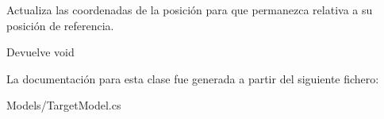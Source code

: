 Actualiza las coordenadas de la posición para que permanezca relativa a su posición de referencia. \begin{DoxyReturn}{Devuelve}
void 
\end{DoxyReturn}


La documentación para esta clase fue generada a partir del siguiente fichero\+:\begin{DoxyCompactItemize}
\item 
Models/Target\+Model.\+cs\end{DoxyCompactItemize}
